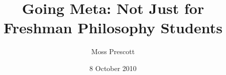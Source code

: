\documentclass[12pt]{amsart}
\title{Going Meta: Not Just for Freshman Philosophy Students}
\author{Moss Prescott}
\date{8 October 2010}
\begin{document}
\begin{abstract}

\end{abstract}

\maketitle


\newpage
\tableofcontents

\newpage





\end{document}
